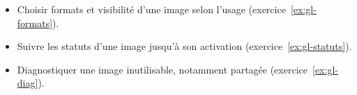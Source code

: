\begin{savoirfaire}
\begin{itemize}
  \item Choisir formats et visibilité d'une image selon l'usage (exercice~\ref{ex:gl-formats}).
  \item Suivre les statuts d'une image jusqu'à son activation (exercice~\ref{ex:gl-statuts}).
  \item Diagnostiquer une image inutilisable, notamment partagée (exercice~\ref{ex:gl-diag}).
\end{itemize}
\end{savoirfaire}
